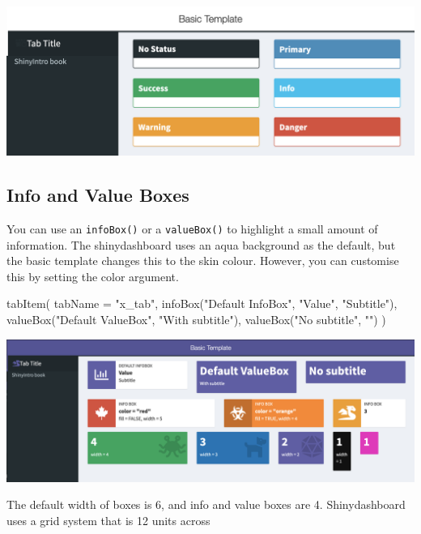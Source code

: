 \documentclass[
]{book}
\newenvironment{Shaded}{\begin{snugshade}}{\end{snugshade}}
\newcommand{\AttributeTok}[1]{\textcolor[rgb]{0.77,0.63,0.00}{#1}}
\newcommand{\FunctionTok}[1]{\textcolor[rgb]{0.00,0.00,0.00}{#1}}
\newcommand{\NormalTok}[1]{#1}
\newcommand{\StringTok}[1]{\textcolor[rgb]{0.31,0.60,0.02}{#1}}
\begin{document}
\includegraphics{images/sdb_box_status.png}

\hypertarget{info-and-value-boxes}{%
\subsection{Info and Value Boxes}\label{info-and-value-boxes}}

You can use an \texttt{infoBox()} or a \texttt{valueBox()} to highlight a small amount of information. The shinydashboard uses an aqua background as the default, but the basic template changes this to the skin colour. However, you can customise this by setting the color argument.

\begin{Shaded}
\begin{Highlighting}[]
\FunctionTok{tabItem}\NormalTok{(}
    \AttributeTok{tabName =} \StringTok{"x\_tab"}\NormalTok{,}
    \FunctionTok{infoBox}\NormalTok{(}\StringTok{"Default InfoBox"}\NormalTok{, }\StringTok{"Value"}\NormalTok{, }\StringTok{"Subtitle"}\NormalTok{),}
    \FunctionTok{valueBox}\NormalTok{(}\StringTok{"Default ValueBox"}\NormalTok{, }\StringTok{"With subtitle"}\NormalTok{),}
    \FunctionTok{valueBox}\NormalTok{(}\StringTok{"No subtitle"}\NormalTok{, }\StringTok{""}\NormalTok{)}
\NormalTok{)}
\end{Highlighting}
\end{Shaded}

\includegraphics{images/sdb_value_info.png}

The default width of boxes is 6, and info and value boxes are 4. Shinydashboard uses a grid system that is 12 units across
\end{document}
